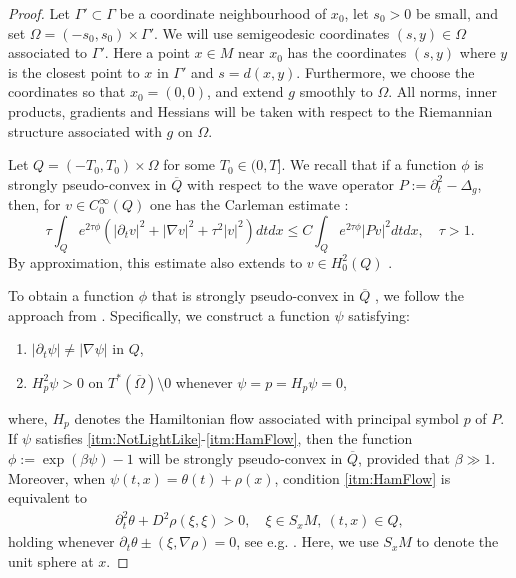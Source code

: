 \documentclass[final,leqno]{siamart1116}
\begin{document}
\begin{proof}
Let $\Gamma' \subset \Gamma$ be a coordinate neighbourhood of $x_0$,
let $s_0 > 0$ be small, and set $\Omega = (-s_0,s_0) \times \Gamma'$.
We will use semigeodesic coordinates $(s,y) \in \Omega$ associated to
$\Gamma'$.  Here a point $x \in M$ near $x_0$ has the coordinates
$(s,y)$ where $y$ is the closest point to $x$ in $\Gamma'$ and $s =
d(x, y)$.  Furthermore, we choose the coordinates so that $x_0 =
(0,0)$, and extend $g$ smoothly to $\Omega$. All norms, inner
products, gradients and Hessians will be taken with
respect to the Riemannian structure associated with $g$ on $\Omega$.

Let $Q = (-T_0,T_0) \times \Omega$ for some $T_0 \in (0,T]$. We recall
  that if a function $\phi$ is strongly pseudo-convex in
  $\overline{Q}$ with respect to the wave operator $P := {\partial}_t^2
  -\Delta_g$, then, for $v \in C_0^\infty(Q)$ one has the Carleman
  estimate \cite[Thm. 28.2.3]{Hormander1985a}:
\begin{equation}
  \label{eqn:CarlemanEstimate}
  \tau \int_{Q} e^{2 \tau \phi} (|{\partial}_t v|^2 + |\nabla v|^2 + \tau^2 |v|^2) dt dx
  \le C \int_{Q} e^{2 \tau \phi} |Pv|^2 dt dx, \quad \tau > 1.
\end{equation}
By approximation, this estimate also extends to $v \in H_0^2(Q)$ .

To obtain a function $\phi$ that is strongly pseudo-convex in
$\overline{Q}$ , we follow the approach from \cite{Stefanov2013}.
Specifically, we construct a function $\psi$ satisfying:
\begin{enumerate}[label=(\roman*), topsep=4pt]
  \item \label{itm:NotLightLike} $|{\partial}_t \psi| \neq |\nabla \psi|$ in $Q$,
  \item \label{itm:HamFlow} $H_p^2 \psi > 0$ on
    $T^*(\overline{\Omega})\setminus 0$ whenever $\psi = p = H_p \psi
    = 0$,
\end{enumerate}
where, $H_p$ denotes the Hamiltonian flow associated with principal
symbol $p$ of $P$. If $\psi$ satisfies
\ref{itm:NotLightLike}-\ref{itm:HamFlow}, then the function $\phi :=
\exp(\beta \psi) - 1$ will be strongly pseudo-convex in
$\overline{Q}$, provided that $\beta \gg 1$. Moreover, when $\psi(t,x)
= \theta(t) + \rho(x)$, condition \ref{itm:HamFlow} is equivalent to
\begin{align}
\label{pseudo_convexity}
{\partial}_t^2 \theta + D^2 \rho(\xi,\xi) > 0, \quad 
\xi \in S_x M,\ (t,x) \in Q,
\end{align}
holding whenever ${\partial}_t \theta \pm (\xi, \nabla \rho) = 0$, see e.g.
\cite{Stefanov2013}. Here, we use $S_x M$ to denote the unit sphere at $x$. 


\end{proof}
\end{document}
